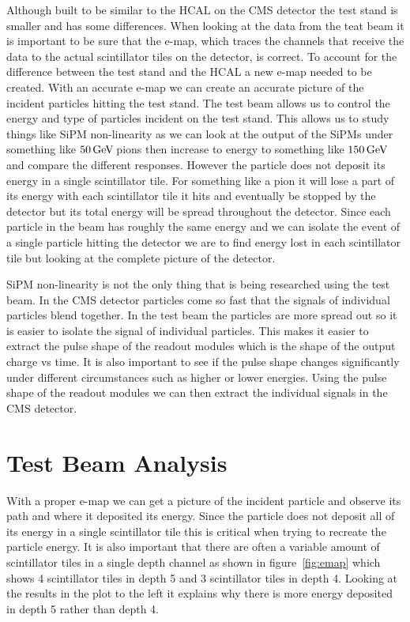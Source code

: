 Although built to be similar to the HCAL on the CMS detector the test stand is smaller and has some differences. When looking at the data from the teat beam it is important to be sure that the e-map, which traces the channels that receive the data to the actual scintillator tiles on the detector, is correct. To account for the difference between the test stand and the HCAL a new e-map needed to be created. With an accurate e-map we can create an accurate picture of the incident particles hitting the test stand. The test beam allows us to control the energy and type of particles incident on the test stand. This allows us to study things like SiPM non-linearity as we can look at the output of the SiPMs under something like $50{\,\text{Ge\hspace{-.08em}V\hspace{-0.16em}}}$ pions then increase to energy to something like $150{\,\text{Ge\hspace{-.08em}V\hspace{-0.16em}}}$ and compare the different responses. However the particle does not deposit its energy in a single scintillator tile. For something like a pion it will lose a part of its energy with each scintillator tile it hits and eventually be stopped by the detector but its total energy will be spread throughout the detector. Since each particle in the beam has roughly the same energy and we can isolate the event of a single particle hitting the detector we are to find energy lost in each scintillator tile but looking at the complete picture of the detector. 

SiPM non-linearity is not the only thing that is being researched using the test beam. In the CMS detector particles come so fast that the signals of individual particles blend together. In the test beam the particles are more spread out so it is easier to isolate the signal of individual particles. This makes it easier to extract the pulse shape of the readout modules which is the shape of the output charge vs time. It is also important to see if the pulse shape changes significantly under different circumstances such as higher or lower energies. Using the pulse shape of the readout modules we can then extract the individual signals in the CMS detector.

\section{Test Beam Analysis}

With a proper e-map we can get a picture of the incident particle and observe its path and where it deposited its energy. Since the particle does not deposit all of its energy in a single scintillator tile this is critical when trying to recreate the particle energy. It is also important that there are often a variable amount of scintillator tiles in a single depth channel as shown in figure~\ref{fig:emap} which shows 4 scintillator tiles in depth 5 and 3 scintillator tiles in depth 4. Looking at the results in the plot to the left it explains why there is more energy deposited in depth 5 rather than depth 4. 

